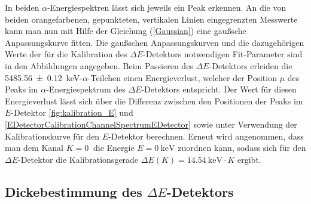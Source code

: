 In beiden $\alpha$-Energiespektren lässt sich jeweils ein Peak erkennen.
An die von beiden orangefarbenen, gepunkteten, vertikalen Linien eingegrenzten Messwerte kann man nun mit Hilfe der Gleichung (\ref{Gaussian}) eine gaußsche Anpassungskurve fitten.
Die gaußschen Anpassungskurven und die dazugehörigen Werte der für die Kalibration des $\Delta E$-Detektors notwendigen Fit-Parameter sind in den Abbildungen angegeben.
Beim Passieren des $\Delta E$-Detektors erleiden die \SI{5485,56 +- 0,12}{\kilo\electronvolt}-$\alpha$-Teilchen einen Energieverlust, welcher der Position $\mu$ des Peaks im $\alpha$-Energiespektrum des $\Delta E$-Detektors entspricht.
Der Wert für diesen Energieverlust lässt sich über die Differenz zwischen den Positionen der Peaks im $E$-Detektor \cref{fig:kalibration_E} und \cref{EDetectorCalibrationChannelSpectrumEDetector} sowie unter Verwendung der Kalibrationskurve für den $E$-Detektor berechnen.
Erneut wird angenommen, dass man dem Kanal $K=\SI{0}{}$ die Energie $E=\SI{0}{\kilo\electronvolt}$ zuordnen kann, sodass sich für den $\Delta E$-Detektor die Kalibrationsgerade $\Delta E(K) = \SI{14,54}{\kilo\electronvolt} \cdot K$ ergibt.

\subsection{Dickebestimmung des $\Delta E$-Detektors} \label{sec:de_kalibration}

